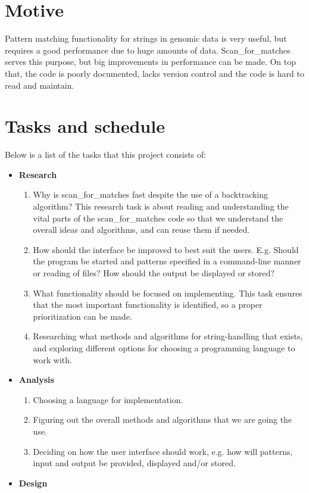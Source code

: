 \documentclass[12pt]{article}
\begin{document}
\section{Motive}
Pattern matching functionality for strings in genomic data is very useful, 
but requires a good performance due to huge amounts of data. 
Scan\_for\_matches serves this purpose, but big improvements in performance can be made.
On top that, the code is poorly documented, lacks version control and the code is hard to read and maintain.
\section{Tasks and schedule}
Below is a list of the tasks that this project consists of:
\begin{itemize}
\item \textbf{Research} 
\begin{enumerate}
\item Why is scan\_for\_matches fast despite the use of a backtracking algorithm? This research task is about 
reading and understanding the vital parts of the scan\_for\_matches code so that we understand the overall
ideas and algorithms, and can reuse them if needed.
\item How should the interface be improved to best suit the users. E.g. Should the program be started and
patterns specified in a command-line manner or reading of files? How should the output be displayed or stored?
\item What functionality should be focused on implementing. This task ensures that the most important functionality is 
identified, so a proper prioritization can be made.
\item Researching what methods and algorithms for string-handling that exists, and exploring different options for 
choosing a programming language to work with.
\end{enumerate}
\item \textbf{Analysis}
\begin{enumerate}
\item Choosing a language for implementation.
\item Figuring out the overall methods and algorithms that we are going the use.
\item Deciding on how the user interface should work, e.g. how will patterns, input and output be provided, displayed 
and/or stored.
\end{enumerate}
\item \textbf{Design}
\begin{enumerate}

\end{enumerate}
\end{itemize}
\end{document}
